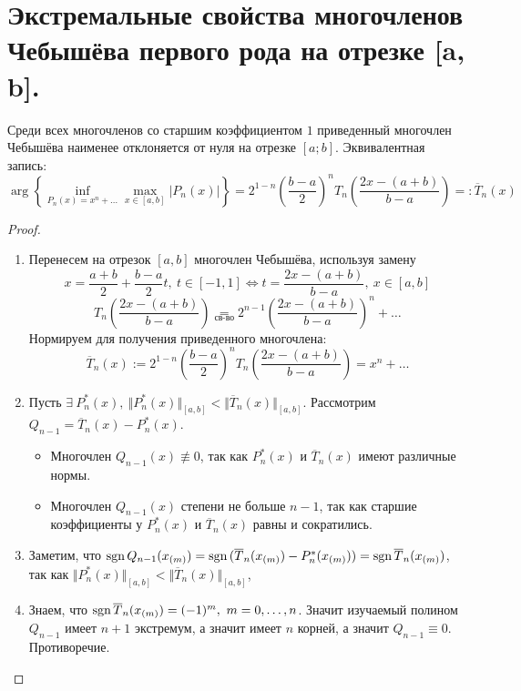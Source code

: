 \section{Экстремальные свойства многочленов Чебышёва первого рода на отрезке [a, b].}

\begin{theorem}
  Среди всех многочленов со старшим коэффициентом $1$
  приведенный многочлен Чебышёва наименее
  отклоняется от нуля на отрезке $[a;b]$. Эквивалентная запись:
  \[\arg\left\{\inf_{P_n(x)=x^n+\ldots}\max_{x\in[a,b]}{|P_n(x)|}\right\}=2^{1-n}\left(\frac{b-a}{2}\right)^nT_n\left(\frac{2x-(a+b)}{b-a}\right)=:\overline{T}_n(x)\]
\end{theorem}
\begin{proof}
  \begin{enumerate}
    \item Перенесем на отрезок $[a,b]$ многочлен Чебышёва, используя замену
          \[x=\frac{a+b}{2}+\frac{b-a}{2}t,\ t\in[-1,1]\Leftrightarrow t=\frac{2x-(a+b)}{b-a},\ x\in[a,b]\]
          \[T_n\left(\frac{2x-(a+b)}{b-a}\right)\underset{\text{св-во}}{=}2^{n-1}\left(\frac{2x-(a+b)}{b-a}\right)^n+\ldots\]
          Нормируем для получения приведенного многочлена:
          \[\overline{T}_n(x):=2^{1-n}\left(\frac{b-a}{2}\right)^nT_n\left(\frac{2x-(a+b)}{b-a}\right)=x^n+\ldots\]
    \item Пусть $\exists\ P_n^*(x),\ \Vert P_n^*(x)\Vert_{[a,b]}<\Vert\overline{T}_n(x)\Vert_{[a,b]}$.
          Рассмотрим $Q_{n-1}=\overline{T}_n(x)-P_n^*(x)$.
          \begin{itemize}
            \item Многочлен $Q_{n-1}(x)\not\equiv0$, так
                  как $P_n^*(x)$ и $\overline{T}_n(x)$ имеют различные нормы.
            \item Многочлен $Q_{n-1}(x)$ степени не больше $n-1$, так
                  как старшие коэффициенты у $P_n^*(x)$ и $\overline{T}_n(x)$ равны и сократились.
          \end{itemize}
    \item Заметим, что $\operatorname{sgn}{Q_{n-1}(x_{(m)})}=\operatorname{sgn}{(\overline{T}_n(x_{(m)})-P_n^*(x_{(m)}))}=\operatorname{sgn}{\overline{T}_n(x_{(m)})}$, так как
          $\Vert P_n^*(x)\Vert_{[a,b]}<\Vert\overline{T}_n(x)\Vert_{[a,b]}$,
    \item Знаем, что $\sgn{\overline{T}_n(x_{(m)})}=(-1)^m,\ m=0,\ldots,n$. Значит
          изучаемый полином $Q_{n-1}$ имеет $n+1$ экстремум, а значит имеет $n$ корней,
          а значит $Q_{n-1}\equiv0$. Противоречие.
  \end{enumerate}
\end{proof}

